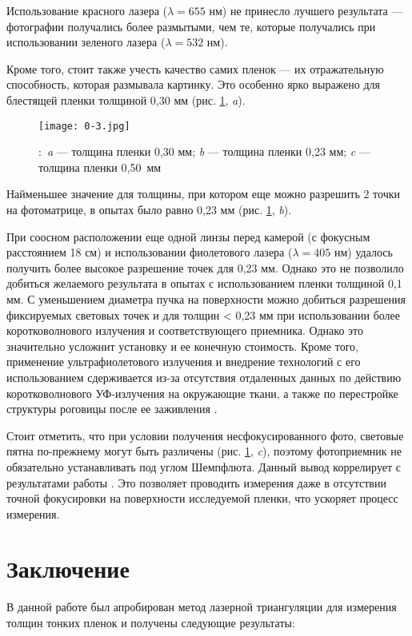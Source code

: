 Использование красного лазера ($\lambda=655$ нм) не принесло лучшего результата --- фотографии получались более размытыми, чем те, которые получались при использовании зеленого лазера
($\lambda=532$ нм).


Кроме того, стоит также учесть качество самих пленок --- их отражательную способность, которая размывала картинку. Это особенно ярко выражено для блестящей пленки толщиной 0,30 мм (рис. \ref{ris:0-30}, \emph{a}).

\begin{figure}[h]
\begin{center}
\texttt{[image: 0-3.jpg]}
\end{center}
\caption{\!\!\!\!:\ \emph{a} --- толщина пленки 0,30 мм; \emph{b} --- толщина пленки 0,23 мм; \emph{c} --- толщина пленки 0,50~мм}
\label{ris:0-30}
\end{figure}

Найменьшее значение для толщины, при котором еще можно разрешить 2 точки на фотоматрице, в опытах было равно 0,23 мм (рис. \ref{ris:0-30}, \emph{b}).


При соосном расположении еще одной линзы перед камерой (с фокусным расстоянием 18 см) и использовании фиолетового лазера
($\lambda=405$ нм) удалось получить более высокое разрешение точек для 0,23 мм. Однако это не позволило добиться желаемого результата в опытах с использованием пленки толщиной 0,1 мм. С уменьшением диаметра пучка на поверхности можно добиться разрешения фиксируемых световых точек и для толщин < 0,23 мм при использовании более коротковолнового излучения и соответствующего приемника. Однако это значительно усложнит установку и ее конечную стоимость. Кроме того, применение ультрафиолетового излучения и внедрение технологий с его использованием сдерживается из-за отсутствия отдаленных данных по действию коротковолнового УФ-излучения на окружающие ткани, а также по перестройке структуры роговицы после ее заживления \cite{tuchini}.


Стоит отметить, что при условии получения несфокусированного фото, световые пятна по-прежнему могут быть различены
(рис. \ref{ris:0-30}, \emph{c}), поэтому фотоприемник не обязательно устанавливать под углом Шемпфлюта. Данный вывод коррелирует с результатами работы \cite{burkov}. Это позволяет проводить измерения даже в отсутствии точной фокусировки на поверхности исследуемой пленки, что ускоряет процесс измерения.

\section*{Заключение}
В данной работе был апробирован метод лазерной триангуляции для измерения толщин тонких пленок и получены следующие результаты:

